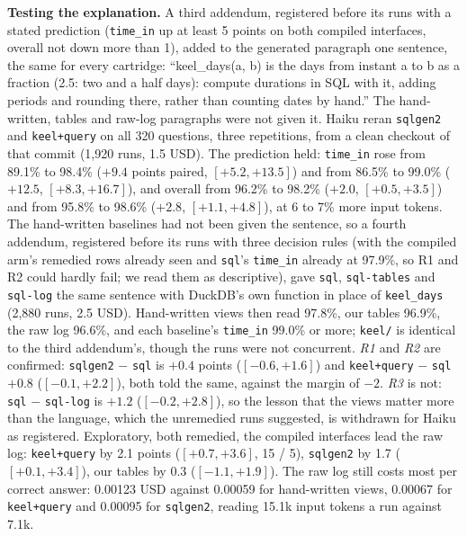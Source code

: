 \documentclass[sigconf, nonacm]{acmart}
\newcommand{\code}[1]{\texttt{#1}}
\begin{document}
\textbf{Testing the explanation.} A third addendum, registered before its runs with a stated prediction (\code{time\_in} up at least 5 points on both compiled interfaces, overall not down more than 1), added to the generated paragraph one sentence, the same for every cartridge: ``keel\_days(a, b) is the days from instant a to b as a fraction (2.5: two and a half days): compute durations in SQL with it, adding periods and rounding there, rather than counting dates by hand.'' The hand-written, tables and raw-log paragraphs were not given it. Haiku reran \code{sqlgen2} and \code{keel+query} on all 320 questions, three repetitions, from a clean checkout of that commit (1,920 runs, 1.5 USD). The prediction held: \code{time\_in} rose from 89.1\% to 98.4\% ($+9.4$ points paired, $[+5.2, +13.5]$) and from 86.5\% to 99.0\% ($+12.5$, $[+8.3, +16.7]$), and overall from 96.2\% to 98.2\% ($+2.0$, $[+0.5, +3.5]$) and from 95.8\% to 98.6\% ($+2.8$, $[+1.1, +4.8]$), at 6 to 7\% more input tokens. The hand-written baselines had not been given the sentence, so a fourth addendum, registered before its runs with three decision rules (with the compiled arm's remedied rows already seen and \code{sql}'s \code{time\_in} already at 97.9\%, so R1 and R2 could hardly fail; we read them as descriptive), gave \code{sql}, \code{sql-tables} and \code{sql-log} the same sentence with DuckDB's own function in place of \code{keel\_days} (2,880 runs, 2.5 USD). Hand-written views then read 97.8\%, our tables 96.9\%, the raw log 96.6\%, and each baseline's \code{time\_in} 99.0\% or more; \code{keel/} is identical to the third addendum's, though the runs were not concurrent. \emph{R1} and \emph{R2} are confirmed: \code{sqlgen2} $-$ \code{sql} is $+0.4$ points ($[-0.6, +1.6]$) and \code{keel+query} $-$ \code{sql} $+0.8$ ($[-0.1, +2.2]$), both told the same, against the margin of $-2$. \emph{R3} is not: \code{sql} $-$ \code{sql-log} is $+1.2$ ($[-0.2, +2.8]$), so the lesson that the views matter more than the language, which the unremedied runs suggested, is withdrawn for Haiku as registered. Exploratory, both remedied, the compiled interfaces lead the raw log: \code{keel+query} by 2.1 points ($[+0.7, +3.6]$, 15 / 5), \code{sqlgen2} by 1.7 ($[+0.1, +3.4]$), our tables by 0.3 ($[-1.1, +1.9]$). The raw log still costs most per correct answer: 0.00123 USD against 0.00059 for hand-written views, 0.00067 for \code{keel+query} and 0.00095 for \code{sqlgen2}, reading 15.1k input tokens a run against 7.1k.
\end{document}
